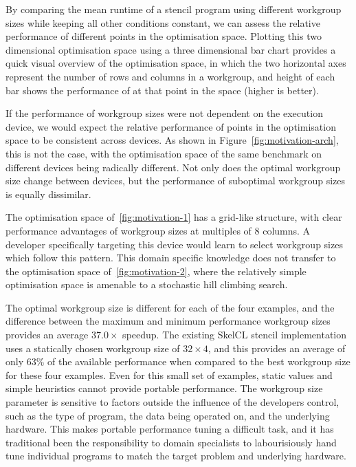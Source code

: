 By comparing the mean runtime of a stencil program using different
workgroup sizes while keeping all other conditions constant, we can
assess the relative performance of different points in the
optimisation space. Plotting this two dimensional optimisation space
using a three dimensional bar chart provides a quick visual overview
of the optimisation space, in which the two horizontal axes represent
the number of rows and columns in a workgroup, and height of each bar
shows the performance of at that point in the space (higher is
better).

If the performance of workgroup sizes were not dependent on the
execution device, we would expect the relative performance of points
in the optimisation space to be consistent across devices. As shown in
Figure~\ref{fig:motivation-arch}, this is not the case, with the
optimisation space of the same benchmark on different devices being
radically different. Not only does the optimal workgroup size change
between devices, but the performance of suboptimal workgroup sizes is
equally dissimilar.

The optimisation space of~\ref{fig:motivation-1} has a grid-like
structure, with clear performance advantages of workgroup sizes at
multiples of 8 columns. A developer specifically targeting this device
would learn to select workgroup sizes which follow this pattern. This
domain specific knowledge does not transfer to the optimisation space
of~\ref{fig:motivation-2}, where the relatively simple optimisation
space is amenable to a stochastic hill climbing search.

The optimal workgroup size is different for each of the four examples,
and the difference between the maximum and minimum performance
workgroup sizes provides an average $37.0\times$ speedup. The existing
SkelCL stencil implementation uses a statically chosen workgroup size
of $32\times4$, and this provides an average of only 63\% of the
available performance when compared to the best workgroup size for
these four examples. Even for this small set of examples, static
values and simple heuristics cannot provide portable performance. The
workgroup size parameter is sensitive to factors outside the influence
of the developers control, such as the type of program, the data being
operated on, and the underlying hardware. This makes portable
performance tuning a difficult task, and it has traditional been the
responsibility to domain specialists to labourisiously hand tune
individual programs to match the target problem and underlying
hardware.

